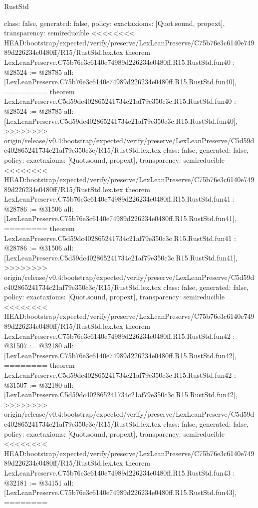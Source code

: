 \begin{lexlean}{RustStd}
\begin{coremodule}
{\begin{coremodule}
{{{{{{{{{{{{{{{{{{{{{{{{{{{{{{{{{{{{{{{{{{{  class: false,
  generated: false,
  policy: exact{axioms: [Quot.sound, propext]},
  transparency: semireducible
}
<<<<<<<< HEAD:bootstrap/expected/verify/preserve/LexLeanPreserve/C75b76e3c6140e74989d226234e0480ff/R15/RustStd.lex.tex
theorem LexLeanPreserve.C75b76e3c6140e74989d226234e0480ff.R15.RustStd.fun40 : @28524 := @28785 {
  all: [LexLeanPreserve.C75b76e3c6140e74989d226234e0480ff.R15.RustStd.fun40],
========
theorem LexLeanPreserve.C5d59dc402865241734c21af79e350c3c.R15.RustStd.fun40 : @28524 := @28785 {
  all: [LexLeanPreserve.C5d59dc402865241734c21af79e350c3c.R15.RustStd.fun40],
>>>>>>>> origin/release/v0.4:bootstrap/expected/verify/preserve/LexLeanPreserve/C5d59dc402865241734c21af79e350c3c/R15/RustStd.lex.tex
  class: false,
  generated: false,
  policy: exact{axioms: [Quot.sound, propext]},
  transparency: semireducible
}
<<<<<<<< HEAD:bootstrap/expected/verify/preserve/LexLeanPreserve/C75b76e3c6140e74989d226234e0480ff/R15/RustStd.lex.tex
theorem LexLeanPreserve.C75b76e3c6140e74989d226234e0480ff.R15.RustStd.fun41 : @28786 := @31506 {
  all: [LexLeanPreserve.C75b76e3c6140e74989d226234e0480ff.R15.RustStd.fun41],
========
theorem LexLeanPreserve.C5d59dc402865241734c21af79e350c3c.R15.RustStd.fun41 : @28786 := @31506 {
  all: [LexLeanPreserve.C5d59dc402865241734c21af79e350c3c.R15.RustStd.fun41],
>>>>>>>> origin/release/v0.4:bootstrap/expected/verify/preserve/LexLeanPreserve/C5d59dc402865241734c21af79e350c3c/R15/RustStd.lex.tex
  class: false,
  generated: false,
  policy: exact{axioms: [Quot.sound, propext]},
  transparency: semireducible
}
<<<<<<<< HEAD:bootstrap/expected/verify/preserve/LexLeanPreserve/C75b76e3c6140e74989d226234e0480ff/R15/RustStd.lex.tex
theorem LexLeanPreserve.C75b76e3c6140e74989d226234e0480ff.R15.RustStd.fun42 : @31507 := @32180 {
  all: [LexLeanPreserve.C75b76e3c6140e74989d226234e0480ff.R15.RustStd.fun42],
========
theorem LexLeanPreserve.C5d59dc402865241734c21af79e350c3c.R15.RustStd.fun42 : @31507 := @32180 {
  all: [LexLeanPreserve.C5d59dc402865241734c21af79e350c3c.R15.RustStd.fun42],
>>>>>>>> origin/release/v0.4:bootstrap/expected/verify/preserve/LexLeanPreserve/C5d59dc402865241734c21af79e350c3c/R15/RustStd.lex.tex
  class: false,
  generated: false,
  policy: exact{axioms: [Quot.sound, propext]},
  transparency: semireducible
}
<<<<<<<< HEAD:bootstrap/expected/verify/preserve/LexLeanPreserve/C75b76e3c6140e74989d226234e0480ff/R15/RustStd.lex.tex
theorem LexLeanPreserve.C75b76e3c6140e74989d226234e0480ff.R15.RustStd.fun43 : @32181 := @34151 {
  all: [LexLeanPreserve.C75b76e3c6140e74989d226234e0480ff.R15.RustStd.fun43],
========
}}}}}}}}}}}}}}}}}}}}}}}}}}}}}}}}}}}}}}}}}}}}}}
\end{coremodule}}
\end{coremodule}
\end{lexlean}
